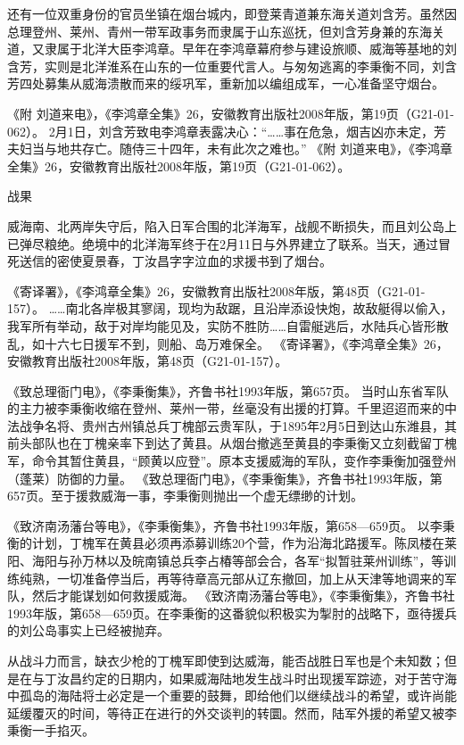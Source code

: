 \documentclass[12pt,UTF8]{ctexbook}
\begin{document}
还有一位双重身份的官员坐镇在烟台城内，即登莱青道兼东海关道刘含芳。虽然因总理登州、莱州、青州一带军政事务而隶属于山东巡抚，但刘含芳身兼的东海关道，又隶属于北洋大臣李鸿章。早年在李鸿章幕府参与建设旅顺、威海等基地的刘含芳，实则是北洋淮系在山东的一位重要代言人。与匆匆逃离的李秉衡不同，刘含芳四处募集从威海溃散而来的绥巩军，重新加以编组成军，一心准备坚守烟台。

《附 刘道来电》，《李鸿章全集》26，安徽教育出版社2008年版，第19页（G21-01-062）。
2月1日，刘含芳致电李鸿章表露决心：“……事在危急，烟吉凶亦未定，芳夫妇当与地共存亡。随侍三十四年，未有此次之难也。” 《附 刘道来电》，《李鸿章全集》26，安徽教育出版社2008年版，第19页（G21-01-062）。

战果

威海南、北两岸失守后，陷入日军合围的北洋海军，战舰不断损失，而且刘公岛上已弹尽粮绝。绝境中的北洋海军终于在2月11日与外界建立了联系。当天，通过冒死送信的密使夏景春，丁汝昌字字泣血的求援书到了烟台。

《寄译署》，《李鸿章全集》26，安徽教育出版社2008年版，第48页（G21-01-157）。
……南北各岸极其寥阔，现均为敌踞，且沿岸添设快炮，故敌艇得以偷入，我军所有举动，敌于对岸均能见及，实防不胜防……自雷艇逃后，水陆兵心皆形散乱，如十六七日援军不到，则船、岛万难保全。 《寄译署》，《李鸿章全集》26，安徽教育出版社2008年版，第48页（G21-01-157）。

《致总理衙门电》，《李秉衡集》，齐鲁书社1993年版，第657页。
当时山东省军队的主力被李秉衡收缩在登州、莱州一带，丝毫没有出援的打算。千里迢迢而来的中法战争名将、贵州古州镇总兵丁槐部云贵军队，于1895年2月5日到达山东潍县，其前头部队也在丁槐亲率下到达了黄县。从烟台撤逃至黄县的李秉衡又立刻截留丁槐军，命令其暂住黄县，“顾黄以应登”。原本支援威海的军队，变作李秉衡加强登州（蓬莱）防御的力量。 《致总理衙门电》，《李秉衡集》，齐鲁书社1993年版，第657页。至于援救威海一事，李秉衡则抛出一个虚无缥缈的计划。

《致济南汤藩台等电》，《李秉衡集》，齐鲁书社1993年版，第658—659页。
以李秉衡的计划，丁槐军在黄县必须再添募训练20个营，作为沿海北路援军。陈凤楼在莱阳、海阳与孙万林以及皖南镇总兵李占椿等部会合，各军“拟暂驻莱州训练”，等训练纯熟，一切准备停当后，再等待章高元部从辽东撤回，加上从天津等地调来的军队，然后才能谋划如何救援威海。 《致济南汤藩台等电》，《李秉衡集》，齐鲁书社1993年版，第658—659页。在李秉衡的这番貌似积极实为掣肘的战略下，亟待援兵的刘公岛事实上已经被抛弃。

从战斗力而言，缺衣少枪的丁槐军即使到达威海，能否战胜日军也是个未知数；但是在与丁汝昌约定的日期内，如果威海陆地发生战斗时出现援军踪迹，对于苦守海中孤岛的海陆将士必定是一个重要的鼓舞，即给他们以继续战斗的希望，或许尚能延缓覆灭的时间，等待正在进行的外交谈判的转圜。然而，陆军外援的希望又被李秉衡一手掐灭。
\end{document}
